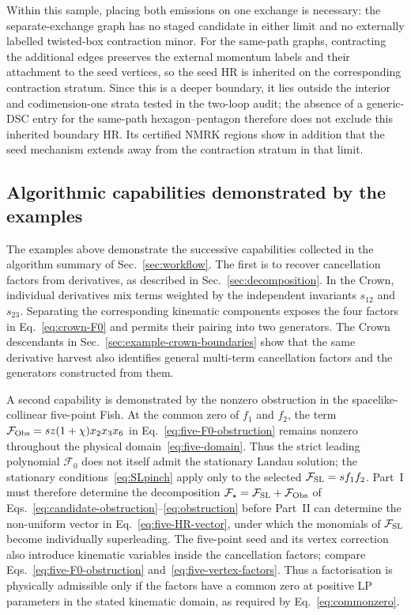 \documentclass[a4paper,11pt]{article}
\newcommand{\FSL}{\mathcal F_{\rm SL}}
\newcommand{\FObs}{\mathcal F_{\rm Obs}}
\begin{document}
Within this sample, placing both emissions on one exchange is necessary:
the separate-exchange graph has no staged candidate in either limit and no
externally labelled twisted-box contraction minor.  For the same-path graphs,
contracting the additional edges preserves the external momentum labels and
their attachment to the seed vertices, so the seed HR is inherited on the
corresponding contraction stratum.  Since this is a deeper boundary, it lies
outside the interior and codimension-one strata tested in the two-loop audit;
the absence of a generic-DSC entry for the same-path hexagon--pentagon therefore
does not exclude this inherited boundary HR.  Its certified NMRK regions show
in addition that the seed mechanism extends away from the contraction stratum
in that limit.

\subsection{Algorithmic capabilities demonstrated by the examples}
\label{sec:capabilities-demonstrated}

The examples above demonstrate the successive capabilities collected in the
algorithm summary of Sec.~\ref{sec:workflow}.  The first is to recover
cancellation factors from derivatives, as described in
Sec.~\ref{sec:decomposition}.  In the Crown, individual derivatives mix terms
weighted by the independent invariants \(s_{12}\) and \(s_{23}\).  Separating
the corresponding kinematic components exposes the four factors in
Eq.~\eqref{eq:crown-F0} and permits their pairing into two generators.  The
Crown descendants in Sec.~\ref{sec:example-crown-boundaries} show that the
same derivative harvest also identifies general multi-term cancellation
factors and the generators constructed from them.

A second capability is demonstrated by the nonzero obstruction in the
spacelike-collinear five-point Fish.  At the common zero of \(f_1\) and
\(f_2\), the term \(\FObs=sz(1+\chi)x_2x_3x_6\) in
Eq.~\eqref{eq:five-F0-obstruction} remains nonzero throughout the physical
domain~\eqref{eq:five-domain}.  Thus the strict leading polynomial
\(\mathcal F_0\) does not itself admit the stationary Landau solution; the
stationary conditions~\eqref{eq:SLpinch} apply only to the selected
\(\FSL=s f_1f_2\).  Part~I must therefore determine the decomposition
\(\mathcal F_\star=\FSL+\FObs\) of
Eqs.~\eqref{eq:candidate-obstruction}--\eqref{eq:obstruction} before Part~II
can determine the non-uniform vector in Eq.~\eqref{eq:five-HR-vector}, under
which the monomials of \(\FSL\) become individually superleading.  The
five-point seed and its vertex correction also introduce kinematic variables
inside the cancellation factors; compare
Eqs.~\eqref{eq:five-F0-obstruction} and~\eqref{eq:five-vertex-factors}.  Thus a
factorisation is physically admissible only if the factors have a common zero
at positive LP parameters in the stated kinematic domain, as required by
Eq.~\eqref{eq:commonzero}.
\end{document}
